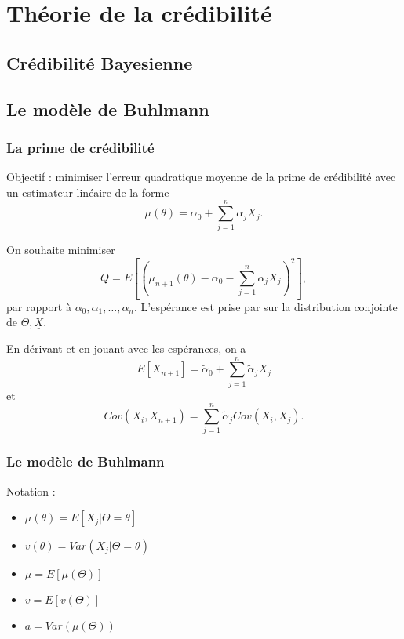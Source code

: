 \part{Théorie de la crédibilité}

\chapter{Crédibilité Bayesienne}


\chapter{Le modèle de Buhlmann}

\section{La prime de crédibilité}

Objectif : minimiser l'erreur quadratique moyenne de la prime de crédibilité avec un estimateur linéaire de la forme $$\mu(\theta) = \alpha_0 + \sum_{j = 1}^{n}\alpha_j X_j.$$

On souhaite minimiser $$Q = E\left[ \left(\mu_{n+1}(\theta) - \alpha_0 - \sum_{j = 1}^{n}\alpha_j X_j\right)^2\right],$$
par rapport à $\alpha_0, \alpha_1, \dots, \alpha_n$. L'espérance est prise par sur la distribution conjointe de $\Theta, \underline{X}$. 

En dérivant et en jouant avec les espérances, on a 
$$E[X_{n+1}] = \tilde{\alpha}_0 + \sum_{j = 1}^{n}\tilde{\alpha}_j X_j$$
et
$$Cov(X_i, X_{n+1}) = \sum_{j = 1}^{n}\tilde{\alpha}_j Cov(X_i, X_j).$$

\section{Le modèle de Buhlmann}

Notation : 

\begin{multicols}{2}
	\begin{itemize}
		\item $\displaystyle \mu(\theta) = E[X_j \vert \Theta = \theta]$
		\item $\displaystyle v(\theta) = Var(X_j \vert \Theta = \theta)$
		\columnbreak
		\item $\displaystyle \mu = E[\mu(\Theta)]$
		\item $\displaystyle v = E[v(\Theta)]$
		\item $\displaystyle a = Var(\mu(\Theta))$
	\end{itemize}
\end{multicols}

